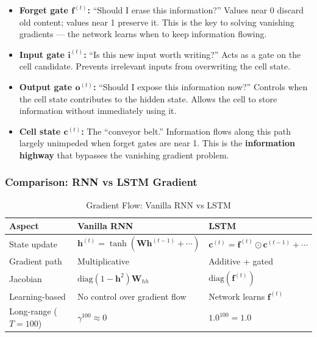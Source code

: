 \begin{properties}
\begin{itemize}
    \item \textbf{Forget gate $\mathbf{f}^{(t)}$:} ``Should I erase this information?'' Values near 0 discard old content; values near 1 preserve it. This is the key to solving vanishing gradients --- the network learns when to keep information flowing.
    \item \textbf{Input gate $\mathbf{i}^{(t)}$:} ``Is this new input worth writing?'' Acts as a gate on the cell candidate. Prevents irrelevant inputs from overwriting the cell state.
    \item \textbf{Output gate $\mathbf{o}^{(t)}$:} ``Should I expose this information now?'' Controls when the cell state contributes to the hidden state. Allows the cell to store information without immediately using it.
    \item \textbf{Cell state $\mathbf{c}^{(t)}$:} The ``conveyor belt.'' Information flows along this path largely unimpeded when forget gates are near 1. This is the \textbf{information highway} that bypasses the vanishing gradient problem.
\end{itemize}
\end{properties}

\subsubsection{Comparison: RNN vs LSTM Gradient}

\begin{table}[ht]
    \centering
    \caption{Gradient Flow: Vanilla RNN vs LSTM}
    \begin{tabular}{L{4cm} L{4.5cm} L{4.5cm}}
        \toprule
        \textbf{Aspect} & \textbf{Vanilla RNN} & \textbf{LSTM} \\
        \midrule
        State update & $\mathbf{h}^{(t)} = \tanh(\mathbf{W}\mathbf{h}^{(t-1)} + \cdots)$ & $\mathbf{c}^{(t)} = \mathbf{f}^{(t)}\odot\mathbf{c}^{(t-1)} + \cdots$ \\
        Gradient path & Multiplicative & Additive + gated \\
        Jacobian & $\text{diag}(1-\mathbf{h}^2)\mathbf{W}_{hh}$ & $\text{diag}(\mathbf{f}^{(t)})$ \\
        Learning-based & No control over gradient flow & Network learns $\mathbf{f}^{(t)}$ \\
        Long-range ($T\!=\!100$) & $\gamma^{100} \approx 0$ & $1.0^{100} = 1.0$ \\
        \bottomrule
    \end{tabular}
\end{table}

